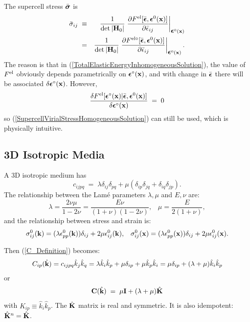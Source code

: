 \documentclass[12pt]{article}
\def\bmath#1{\mbox{\boldmath$#1$}}
\begin{document}
The supercell stress $\bar{\bmath{\sigma}}$ is 
\begin{eqnarray}
 \bar{\sigma}_{ij} \;\equiv&& \frac{1}{\det|{\bf H}_0|}
 \left.\frac{\partial F^{\rm el}[\bar{\bmath{\epsilon}},
 \bmath{\epsilon}^0({\bf x})]}{\partial
 \bar{\epsilon}_{ij}}\right|_{\bmath{\epsilon}^0({\bf x})} \nonumber\\
=&& \frac{1}{\det|{\bf H}_0|}
 \left.\frac{\partial F^{\rm el\circ}[\bar{\bmath{\epsilon}},
 \bmath{\epsilon}^0({\bf x})]}{\partial
 \bar{\epsilon}_{ij}}\right|_{\bmath{\epsilon}^0({\bf x})}.
\end{eqnarray}
The reason is that in (\ref{TotalElasticEnergyInhomogeneousSolution}),
the value of $F^{\rm el}$ obviously depends parametrically on
$\bmath{\epsilon}^\circ({\bf x})$, and with change in
$\bar{\bmath{\epsilon}}$ there will be associated
$\delta\bmath{\epsilon}^\circ({\bf x})$.  However, 
\begin{equation}
 \frac{\delta F^{\rm el}[\bmath{\epsilon}^\circ({\bf x}) | \bar{\bmath{\epsilon}}, \bmath{\epsilon}^0({\bf x})] }{\delta \bmath{\epsilon}^\circ({\bf x})} \;=\; 0
\end{equation}
so (\ref{SupercellVirialStressHomogeneousSolution}) can still be used,
which is physically intuitive.


\subsection{3D Isotropic Media}
\label{sec:3DIsotropicMedia}

A 3D isotropic medium has 
\begin{equation}
 c_{ijpq} \;=\; \lambda \delta_{ij}\delta_{pq} + 
\mu(\delta_{ip}\delta_{jq}+\delta_{iq}\delta_{jp}).
\end{equation}
The relationship between the Lam\'{e} parameters $\lambda,\mu$ and $E,\nu$ are:
\begin{equation}
 \lambda = \frac{2\nu\mu}{1-2\nu} = \frac{E\nu}{(1+\nu)(1-2\nu)}, \;\;\;
 \mu = \frac{E}{2(1+\nu)},
\end{equation}
and the relationship between stress and strain is:
\begin{equation}
 \sigma^0_{ij}({\bf k}) = (\lambda\epsilon^0_{pp}({\bf k}))\delta_{ij} 
                            + 2\mu\epsilon^0_{ij}({\bf k}), \;\;\;
 \sigma^0_{ij}({\bf x}) = (\lambda\epsilon^0_{pp}({\bf x}))\delta_{ij} 
                            + 2\mu\epsilon^0_{ij}({\bf x}).
\end{equation}

Then (\ref{C_Definition}) becomes:
\begin{equation}
 C_{ip}(\hat{\bf k}) = c_{ijpq} \hat{k}_j\hat{k}_q = 
\lambda \hat{k}_i \hat{k}_p + \mu \delta_{ip} + \mu \hat{k}_p\hat{k}_i  =
 \mu \delta_{ip} + (\lambda+\mu) \hat{k}_i \hat{k}_p
\end{equation}
or
\begin{equation}
 {\bf C}(\hat{\bf k}) \;=\; \mu{\bf I}+(\lambda+\mu) \hat{\bf K}
\end{equation}
with $K_{ip}\equiv \hat{k}_i \hat{k}_p$.  The $\hat{\bf K}$ matrix is
real and symmetric.  It is also idempotent: $\hat{\bf K}^n=\hat{\bf
K}$.
\end{document}
